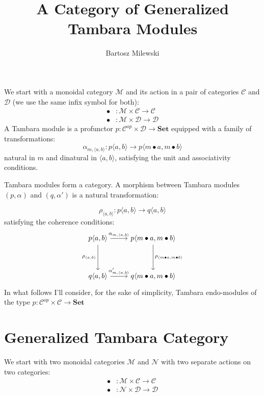 \documentclass[11pt]{amsart}
\author{Bartosz Milewski}
\title{A Category of Generalized Tambara Modules}
\newcommand{\cat}[1]{\mathcal{#1}}%
\newcommand{\Cat}[1]{\mathbf{#1}}%
\begin{document}
\maketitle{}

We start with a monoidal category $\cat M$ and its action in a pair of categories $\cat C$ and $ \cat D$ (we use the same infix symbol for both):
\begin{align*} 
\bullet &\colon \cat M \times \cat C \to \cat C 
\\
 \bullet &\colon \cat M \times \cat D \to \cat D 
\end{align*}
A Tambara module is a profunctor $p \colon \cat C^{op} \times \cat D \to \Cat{Set}$ equipped with a family of transformations:
\[ \alpha_{m, \langle a, b \rangle} \colon p \langle a, b \rangle \to p \langle m \bullet a, m \bullet b \rangle \]
natural in $m$ and dinatural in $\langle a, b \rangle$, satisfying the unit and associativity conditions. 

Tambara modules form a category.  A morphism between Tambara modules $(p, \alpha)$ and $(q, \alpha')$ is a natural transformation:

\[ \rho_{\langle a, b \rangle} \colon p \langle a, b \rangle \to q \langle a, b \rangle \]
 satisfying the coherence conditions:
\[
 \begin{tikzcd}
 p \langle a, b \rangle
 \arrow[r, "{\alpha_{m, \langle a, b \rangle}}"]
 \arrow[dd, "{\rho_{ \langle a, b \rangle}}"']
& p \langle m \bullet a, m \bullet b \rangle
 \arrow[dd, "{\rho_{\langle m \bullet a, m \bullet b \rangle}}"]
 \\
  \\
 q \langle a, b \rangle
 \arrow[r, "{\alpha'_{m, \langle a, b \rangle}}"]
& q \langle m \bullet a, m \bullet b \rangle
 \end{tikzcd}
\]
In what follows I'll consider, for the sake of simplicity, Tambara endo-modules of the type  $p \colon \cat C^{op} \times \cat C \to \Cat{Set}$

\section{Generalized Tambara Category}

We start with two monoidal categories $\cat M$ and $\cat N$ with two separate actions on two categories:
\begin{align*} 
\bullet &\colon \cat M \times \cat C \to \cat C 
\\
 \bullet &\colon \cat N \times \cat D \to \cat D 
\end{align*}
\end{document}
